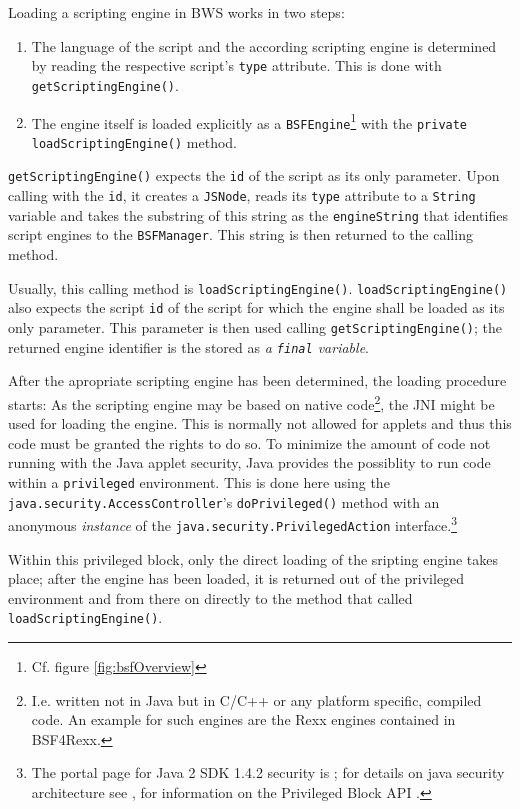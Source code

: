Loading a scripting engine in BWS works in two steps:
\begin{enumerate}
	\item The language of the script and the according scripting engine is determined by reading the respective script's \texttt{type} attribute. This is done with \texttt{getScriptingEngine()}.
	\item The engine itself is loaded explicitly as a \texttt{BSFEngine}\footnote{Cf. figure \ref{fig:bsfOverview}} with the \texttt{private loadScriptingEngine()} method.
\end{enumerate}

\texttt{getScriptingEngine()} expects the \texttt{id} of the script as its only parameter. Upon calling with the \texttt{id}, it creates a \texttt{JSNode}, reads its \texttt{type} attribute to a \texttt{String} variable and takes the substring of this string as the \texttt{engineString} that identifies script engines to the \texttt{BSFManager}. This string is then returned to the calling method.

Usually, this calling method is \texttt{loadScriptingEngine()}. \texttt{loadScriptingEngine()} also expects the script \texttt{id} of the script for which the engine shall be loaded as its only parameter. This parameter is then used calling \texttt{getScriptingEngine()}; the returned engine identifier is the stored as \emph{a \texttt{final} variable}.

After the apropriate scripting engine has been determined, the loading procedure starts: As the scripting engine may be based on native code\footnote{I.e. written not in Java but in C/C++ or any platform specific, compiled code. An example for such engines are the Rexx engines contained in BSF4Rexx.}, the JNI might be used for loading the engine. This is normally not allowed for applets and thus this code must be granted the rights to do so. To minimize the amount of code not running with the Java applet security, Java provides the possiblity to run code within a \texttt{privileged} environment. This is done here using the \texttt{java.security.AccessController}'s \texttt{doPrivileged()} method with an anonymous \emph{instance} of the \texttt{java.security.PrivilegedAction} interface.\footnote{The portal page for Java 2 SDK 1.4.2 security is \cite{JSecOver}; for details on java security architecture see \cite{JSecArch}, for information on the Privileged Block API \cite{JPrivBl}.} 

Within this privileged block, only the direct loading of the sripting engine takes place; after the engine has been loaded, it is returned out of the privileged environment and from there on directly to the method that called \texttt{loadScriptingEngine()}.
